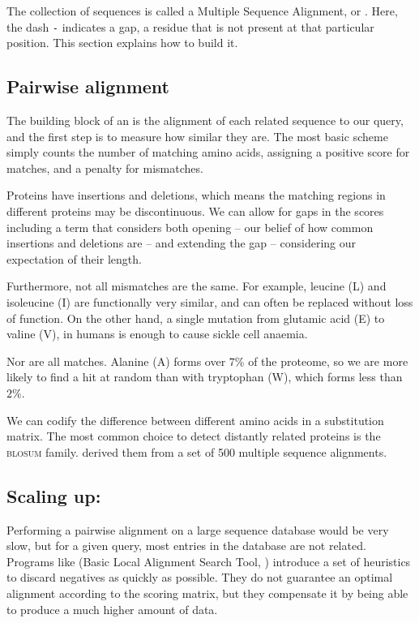 The collection of sequences is called a Multiple Sequence Alignment, or \MSA.
Here, the dash \texttt{-} indicates a gap, a residue that is not present at that particular position.
This section explains how to build it.


\subsection{Pairwise alignment}
The building block of an \MSA{} is the alignment of each related sequence to our query, and the first step is to measure how similar they are.
The most basic scheme simply counts the number of matching amino acids, assigning a positive score for matches, and a penalty for mismatches.

Proteins  have insertions and deletions, which means the matching regions in different proteins may be discontinuous.
We can allow for gaps in the scores including a term that considers both opening -- our belief of how common insertions and deletions are -- and extending the gap -- considering our expectation of their length.

Furthermore, not all mismatches are the same.
For example, leucine (L) and isoleucine (I) are functionally very similar, and can often be replaced without loss of function.
On the other hand, a single mutation from glutamic acid (E) to valine (V), in humans is enough to cause sickle cell anaemia.

Nor are all matches.
Alanine (A) forms over $7\%$ of the proteome, so we are more likely to find a hit at random than with tryptophan (W), which forms less than $2\%$.

We can codify  the difference between different amino acids in a substitution matrix.
The most common choice to detect distantly related proteins is the \textsc{blosum} family.
\citet{blosum} derived them from a set of 500 multiple sequence alignments.

\subsection{Scaling up: \BLAST}
Performing a pairwise alignment on a large sequence database would be very slow, but for a given query, most entries in the database are not related.
Programs like \BLAST{} (Basic Local Alignment Search Tool, \citep{blast}) introduce a set of heuristics to discard negatives as quickly as possible.
They do not guarantee an optimal alignment according to the scoring matrix, but they compensate it by being able to produce a much higher amount of data.


